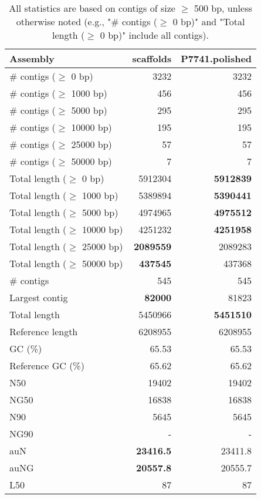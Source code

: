 \documentclass[12pt,a4paper]{article}
\begin{document}
\begin{table}[ht]
\begin{center}
\caption{All statistics are based on contigs of size $\geq$ 500 bp, unless otherwise noted (e.g., "\# contigs ($\geq$ 0 bp)" and "Total length ($\geq$ 0 bp)" include all contigs).}
\begin{tabular}{|l*{2}{|r}|}
\hline
Assembly & scaffolds & P7741.polished \\ \hline
\# contigs ($\geq$ 0 bp) & 3232 & 3232 \\ \hline
\# contigs ($\geq$ 1000 bp) & 456 & 456 \\ \hline
\# contigs ($\geq$ 5000 bp) & 295 & 295 \\ \hline
\# contigs ($\geq$ 10000 bp) & 195 & 195 \\ \hline
\# contigs ($\geq$ 25000 bp) & 57 & 57 \\ \hline
\# contigs ($\geq$ 50000 bp) & 7 & 7 \\ \hline
Total length ($\geq$ 0 bp) & 5912304 & {\bf 5912839} \\ \hline
Total length ($\geq$ 1000 bp) & 5389894 & {\bf 5390441} \\ \hline
Total length ($\geq$ 5000 bp) & 4974965 & {\bf 4975512} \\ \hline
Total length ($\geq$ 10000 bp) & 4251232 & {\bf 4251958} \\ \hline
Total length ($\geq$ 25000 bp) & {\bf 2089559} & 2089283 \\ \hline
Total length ($\geq$ 50000 bp) & {\bf 437545} & 437368 \\ \hline
\# contigs & 545 & 545 \\ \hline
Largest contig & {\bf 82000} & 81823 \\ \hline
Total length & 5450966 & {\bf 5451510} \\ \hline
Reference length & 6208955 & 6208955 \\ \hline
GC (\%) & 65.53 & 65.53 \\ \hline
Reference GC (\%) & 65.62 & 65.62 \\ \hline
N50 & 19402 & 19402 \\ \hline
NG50 & 16838 & 16838 \\ \hline
N90 & 5645 & 5645 \\ \hline
NG90 & - & - \\ \hline
auN & {\bf 23416.5} & 23411.8 \\ \hline
auNG & {\bf 20557.8} & 20555.7 \\ \hline
L50 & 87 & 87 \\ \hline

\end{tabular}
\end{center}
\end{table}
\end{document}
